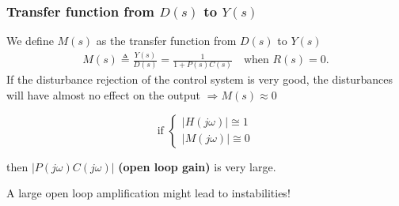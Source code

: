 \begin{frame}
	\frametitle{Transfer function from $D(s)$ to $Y(s)$}
	\begin{definition}
		We define $M(s)$ as the transfer function from $D(s)$ to $Y(s)$
		\begin{align*}
		M(s) \triangleq \frac{Y(s)}{D(s)} = \frac{1}{1 + P(s)C(s)} \quad \text{when } R(s) = 0.
		\end{align*}
		If the disturbance rejection of the control system is very good, the disturbances will have almost no effect on the output $\Rightarrow M(s) \approx 0$ \\
	\end{definition}
	\begin{block}{}
		\vspace*{-1em}
		\begin{minipage}{0.2\linewidth}
		\[\text{if }
		\begin{cases}
			\left| H(j\omega) \right| \cong 1 \\
			\left| M(j\omega) \right| \cong 0
		\end{cases}
		\]
	\end{minipage}
	\hfill
	\begin{minipage}{0.7\linewidth}
		\vspace*{1em}
		then $ \left| P(j\omega)C(j\omega) \right|$ \textbf{(open loop gain)} is very large.
	\end{minipage}
	\end{block}
	\begin{alertblock}{}
		A large open loop amplification might lead to instabilities!
	\end{alertblock}
\end{frame}

